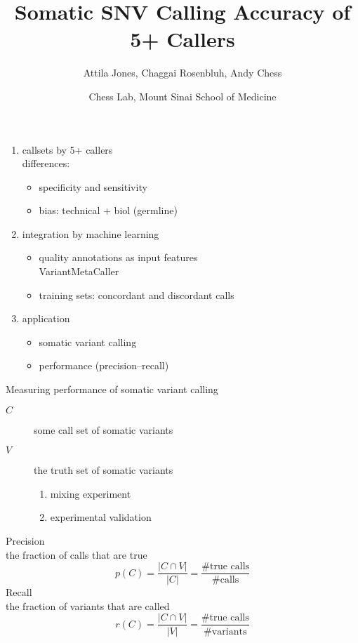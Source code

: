 \documentclass{beamer}
\title{Somatic SNV Calling Accuracy of 5+ Callers}
\author{Attila Jones, Chaggai Rosenbluh, Andy Chess}
\date{Chess Lab, Mount Sinai School of Medicine}
\begin{document}
\maketitle

\begin{frame}
\begin{enumerate}
\item callsets by 5+ callers\\
differences:
\begin{itemize}
\item specificity and sensitivity
\item bias: technical + biol (germline)
\end{itemize}
\item integration by machine learning
\begin{itemize}
\item quality annotations as input features\\
VariantMetaCaller
\item training sets: concordant and discordant calls
\end{itemize}
\item application 
\begin{itemize}
\item somatic variant calling
\item performance (precision--recall)
\end{itemize}
\end{enumerate}
\end{frame}

\begin{frame}[label=precrecall]{Measuring performance of somatic variant calling}
\begin{description}
\item [\(C\)] some call set of somatic variants
\item [\(V\)] the truth set of somatic variants
\begin{enumerate}
\item mixing experiment
\item experimental validation 
\end{enumerate}
\end{description}
\vfill
\alert{Precision}\\
the fraction of calls that are true
\begin{equation}
p(C) = \frac{|C \cap V|}{|C|} = \frac{\#\text{true calls}}{\#\mathrm{calls}}
\end{equation}
\alert{Recall}\\
the fraction of variants that are called
\begin{equation}
r(C) = \frac{|C \cap V|}{|V|} = \frac{\#\text{true calls}}{\#\mathrm{variants}}
\end{equation}
\end{frame}
\end{document}
